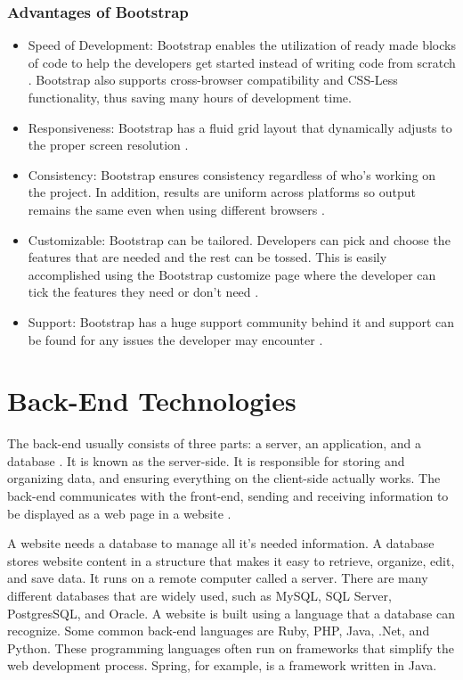 \subsubsection{Advantages of Bootstrap}
\begin{itemize}
	\item Speed of Development: Bootstrap enables the utilization of ready made blocks of code to help the developers get started instead of writing code from scratch \cite{Bootstrap5}. Bootstrap also supports cross-browser compatibility and CSS-Less functionality, thus saving many hours of development time.
	\item Responsiveness: Bootstrap has a fluid grid layout that dynamically adjusts to the proper screen resolution \cite{Bootstrap5}.
	\item Consistency: Bootstrap ensures consistency regardless of who’s working on the project. In addition, results are uniform across platforms so output remains the same even when using different browsers \cite{Bootstrap5}.
	\item Customizable: Bootstrap can be tailored. Developers can pick and choose the features that are needed and the rest can be tossed. This is easily accomplished using the Bootstrap customize page where the developer can tick the features they need or don't need \cite{Bootstrap5}.
	\item Support: Bootstrap has a huge support community behind it and support can be found for any issues the developer may encounter \cite{Bootstrap5}.
\end{itemize}
\section{Back-End Technologies}
The back-end usually consists of three parts: a server, an application, and a database \cite{Backend}. It is known as the server-side. It is responsible for storing and organizing data, and ensuring everything on the client-side actually works. The back-end communicates with the front-end, sending and receiving information to be displayed as a web page in a website \cite{Backend}.

A website needs a database to manage all it's needed information. A database stores website content in a structure that makes it easy to retrieve, organize, edit, and save data. It runs on a remote computer called a server. There are many different databases that are widely used, such as MySQL, SQL Server, PostgresSQL, and Oracle. A website is built using a language that a database can recognize. Some common back-end languages are Ruby, PHP, Java, .Net, and Python. These programming languages often run on frameworks that simplify the web development process. Spring, for example, is a framework written in Java. 
